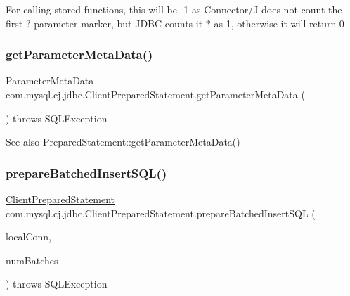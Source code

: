 For calling stored functions, this will be -\/1 as Connector/J does not count the first \textquotesingle{}?\textquotesingle{} parameter marker, but J\+D\+BC counts it $\ast$ as 1, otherwise it will return 0 \mbox{\label{classcom_1_1mysql_1_1cj_1_1jdbc_1_1_client_prepared_statement_aa3c5258b8ab6b147f5d24606d121f7d9}} 
\subsubsection{\texorpdfstring{get\+Parameter\+Meta\+Data()}{getParameterMetaData()}}
{\footnotesize\ttfamily Parameter\+Meta\+Data com.\+mysql.\+cj.\+jdbc.\+Client\+Prepared\+Statement.\+get\+Parameter\+Meta\+Data (\begin{DoxyParamCaption}{ }\end{DoxyParamCaption}) throws S\+Q\+L\+Exception}

\begin{DoxySeeAlso}{See also}
Prepared\+Statement\+::get\+Parameter\+Meta\+Data() 
\end{DoxySeeAlso}
\mbox{\label{classcom_1_1mysql_1_1cj_1_1jdbc_1_1_client_prepared_statement_a43c466c6a5b4c8094dd1f0ce8963feb4}} 
\subsubsection{\texorpdfstring{prepare\+Batched\+Insert\+S\+Q\+L()}{prepareBatchedInsertSQL()}}
{\footnotesize\ttfamily \mbox{\hyperlink{classcom_1_1mysql_1_1cj_1_1jdbc_1_1_client_prepared_statement}{Client\+Prepared\+Statement}} com.\+mysql.\+cj.\+jdbc.\+Client\+Prepared\+Statement.\+prepare\+Batched\+Insert\+S\+QL (\begin{DoxyParamCaption}\item[{\mbox{\hyperlink{interfacecom_1_1mysql_1_1cj_1_1jdbc_1_1_jdbc_connection}{Jdbc\+Connection}}}]{local\+Conn,  }\item[{int}]{num\+Batches }\end{DoxyParamCaption}) throws S\+Q\+L\+Exception\hspace{0.3cm}{\ttfamily [protected]}}

